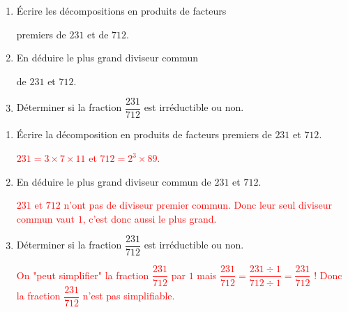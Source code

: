 \begin{exercice*}
    \begin{enumerate}
        \item Écrire les décompositions en produits de facteurs 
        
        premiers de $231$ et de $712$.
        \item En déduire le plus grand diviseur commun
        
        de $231$ et $712$.
        \item Déterminer si la fraction $\dfrac{231}{712}$ est irréductible ou non.
    \end{enumerate}    
\end{exercice*}
\begin{corrige}
        \begin{enumerate}
            \item Écrire la décomposition en produits de facteurs premiers de $231$ et $712$.
            
            \textcolor{red}{
                $231=3\times 7\times 11$ et $712= 2^3\times 89$.
            }      
            \item En déduire le plus grand diviseur commun de $231$ et $712$.
            
            \textcolor{red}{
                $231$ et $712$ n'ont pas de diviseur premier commun. Donc leur seul diviseur commun vaut $1$, c'est donc aussi le plus grand.
            }        
            \item Déterminer si la fraction $\dfrac{231}{712}$ est irréductible ou non.
            
            \textcolor{red}{
                On "peut simplifier" la fraction $\dfrac{231}{712}$ par $1$ mais $\dfrac{231}{712} = \dfrac{231\div 1}{712\div 1} = \dfrac{231}{712}$ !
                Donc la fraction $\dfrac{231}{712}$ n'est pas simplifiable.
            }       
        \end{enumerate}                    
\end{corrige}

